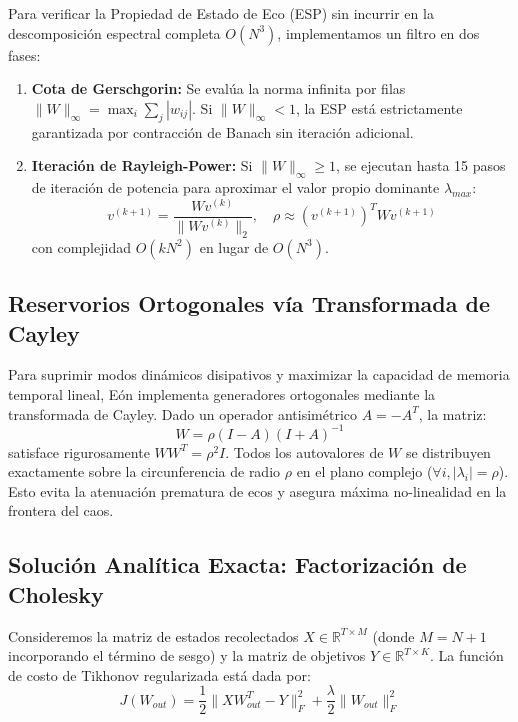 \documentclass[10pt,twocolumn]{article}
\begin{document}
Para verificar la Propiedad de Estado de Eco (ESP) sin incurrir en la descomposición espectral completa $O(N^3)$, implementamos un filtro en dos fases:
\begin{enumerate}
    \item \textbf{Cota de Gerschgorin:} Se evalúa la norma infinita por filas $\|W\|_\infty = \max_i \sum_j |w_{ij}|$. Si $\|W\|_\infty < 1$, la ESP está estrictamente garantizada por contracción de Banach sin iteración adicional.
    \item \textbf{Iteración de Rayleigh-Power:} Si $\|W\|_\infty \ge 1$, se ejecutan hasta 15 pasos de iteración de potencia para aproximar el valor propio dominante $\lambda_{max}$:
    \begin{equation}
    v^{(k+1)} = \frac{W v^{(k)}}{\|W v^{(k)}\|_2}, \quad \rho \approx (v^{(k+1)})^T W v^{(k+1)}
    \end{equation}
    con complejidad $O(k N^2)$ en lugar de $O(N^3)$.
\end{enumerate}

\subsection{Reservorios Ortogonales vía Transformada de Cayley}

Para suprimir modos dinámicos disipativos y maximizar la capacidad de memoria temporal lineal, Eón implementa generadores ortogonales mediante la transformada de Cayley. Dado un operador antisimétrico $A = -A^T$, la matriz:
\begin{equation}
W = \rho (I - A)(I + A)^{-1}
\end{equation}
satisface rigurosamente $W W^T = \rho^2 I$. Todos los autovalores de $W$ se distribuyen exactamente sobre la circunferencia de radio $\rho$ en el plano complejo ($\forall i, |\lambda_i| = \rho$). Esto evita la atenuación prematura de ecos y asegura máxima no-linealidad en la frontera del caos.

\subsection{Solución Analítica Exacta: Factorización de Cholesky}

Consideremos la matriz de estados recolectados $X \in \mathbb{R}^{T \times M}$ (donde $M = N + 1$ incorporando el término de sesgo) y la matriz de objetivos $Y \in \mathbb{R}^{T \times K}$. La función de costo de Tikhonov regularizada está dada por:
\begin{equation}
J(W_{out}) = \frac{1}{2} \|X W_{out}^T - Y\|_F^2 + \frac{\lambda}{2} \|W_{out}\|_F^2
\end{equation}
\end{document}

